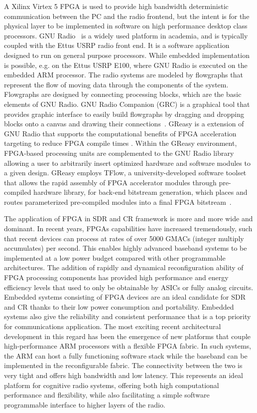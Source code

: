 A Xilinx Virtex 5 FPGA is used to provide high bandwidth deterministic communication between the PC and the radio frontend, but the intent is for the physical layer to be implemented in software on high performance desktop class processors.
GNU Radio~\cite{gnuradio} is a widely used platform in academia, and is typically coupled with the Ettus USRP radio front end. It is a software application designed to run on general purpose processors. While embedded implementation is possible, e.g. on the Ettus USRP E100, where GNU Radio is executed on the embedded ARM processor. The radio systems are modeled by flowgraphs that represent the flow of moving data through the components of the system. Flowgraphs are designed by connecting processing blocks, which are the basic elements of GNU Radio. GNU Radio Companion (GRC) is a graphical tool that provides graphic interface to easily build flowgraphs by dragging and dropping blocks onto a canvas and drawing their connections~\cite{GRC2009}. 
GReasy is a extension of GNU Radio that supports the computational benefits of FPGA acceleration targeting to reduce FPGA compile times \cite{Marlow2014}. Within the GReasy environment, FPGA-based processing units are complemented to the GNU Radio library allowing a user to arbitrarily insert optimized hardware and software modules to a given design. GReasy employs TFlow, a university-developed software toolset that allows the rapid assembly of FPGA accelerator modules through pre-compiled hardware library, for back-end bitstream generation, which places and routes parameterized pre-compiled modules into a final FPGA bitstream~\cite{Love2013}.

The application of FPGA in SDR and CR framework is more and more wide and dominant. In recent years, FPGAs capabilities have increased tremendously, such that recent devices can process at rates of over 5000 GMACs (integer multiply accumulates) per second. This enables highly advanced baseband systems to be implemented at a low power budget compared with other programmable architectures.
The addition of rapidly and dynamical reconfiguration ability of FPGA processing components has provided high performance and energy efficiency levels that used to only be obtainable by ASICs or fully analog circuits. Embedded systems consisting of FPGA devices are an ideal candidate for SDR and CR thanks to their low power consumption and portability. 
Embedded systems also give the reliability and consistent performance that is a top priority for communications application. 
The most exciting recent architectural development in this regard has been the emergence of new platforms that couple high-performance ARM processors with a flexible FPGA fabric. In such systems, the ARM can host a fully functioning software stack while the baseband can be implemented in the reconfigurable fabric. The connectivity between the two is very tight and offers high bandwidth and low latency. This
represents an ideal platform for cognitive radio systems, offering both high computational performance and flexibility, while also facilitating a simple software programmable interface to higher layers of the radio.

